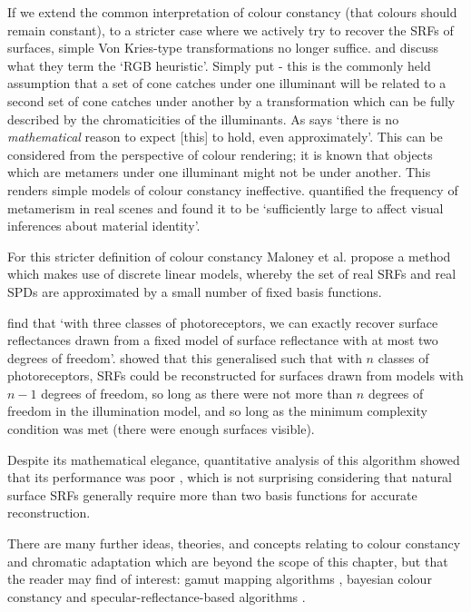 If we extend the common interpretation of colour constancy (that colours should remain constant), to a stricter case where we actively try to recover the \glspl{SRF} of surfaces, simple Von Kries-type transformations no longer suffice. \citet{maloney_physics-based_2001} and \citet{yang_illuminant_2001} discuss what they term the `RGB heuristic'. Simply put - this is the commonly held assumption that a set of cone catches under one illuminant will be related to a second set of cone catches under another by a transformation which can be fully described by the chromaticities of the illuminants. As \citet{maloney_physics-based_2001} says `there is no \emph{mathematical} reason to expect [this] to hold, even approximately'. This can be considered from the perspective of colour rendering; it is known that objects which are metamers under one illuminant might not be under another. This renders simple models of colour constancy ineffective. \citet{foster_frequency_2006} quantified the frequency of metamerism in real scenes and found it to be `sufficiently large to affect visual inferences about material identity'.

For this stricter definition of colour constancy Maloney et al. \citep{maloney_computational_1984, maloney_color_1986} propose a method which makes use of discrete linear models, whereby the set of real \glspl{SRF} and real \glspl{SPD} are approximated by a small number of fixed basis functions. 

\citet{maloney_color_1986} find that `with three classes of photoreceptors, we can exactly recover surface reflectances drawn from a fixed model of surface reflectance with at most two degrees of freedom'. \citet{maloney_computational_1984} showed that this generalised such that with $n$ classes of photoreceptors, \glspl{SRF} could be reconstructed for surfaces drawn from models with $n-1$ degrees of freedom, so long as there were not more than $n$ degrees of freedom in the illumination model, and so long as the minimum complexity condition was met (there were enough surfaces visible).

Despite its mathematical elegance, quantitative analysis of this algorithm showed that its performance was poor \cite{brainard_bayesian_1994, finlayson_color_1995}, which is not surprising considering that natural surface \glspl{SRF} generally require more than two basis functions for accurate reconstruction.

\bigskip

There are many further ideas, theories, and concepts relating to colour constancy and chromatic adaptation which are beyond the scope of this chapter, but that the reader may find of interest: gamut mapping algorithms \citep{forsyth_colour_1990,forsyth_novel_1990,forsyth_colour_1989,finlayson_color_1996}, bayesian colour constancy \citep{finlayson_color_2001, brainard_bayesian_2006,gazzaniga_bayesian_2009, brainard_bayesian_1994,gehler_bayesian_2008} and specular-reflectance-based algorithms \citep{mollon_monge_2006, morimoto_discrimination_2018,hurlbert_computational_1998}.

